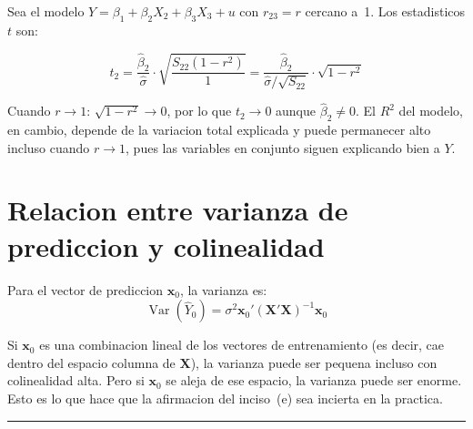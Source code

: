 \documentclass[12pt, letterpaper]{article}
\theoremstyle{remark}
\newcommand{\Var}{\operatorname{Var}}
\begin{document}
Sea el modelo $Y = \beta_1 + \beta_2 X_2 + \beta_3 X_3 + u$ con
$r_{23} = r$ cercano a~1. Los estadisticos $t$ son:

\begin{equation}
  t_2 = \frac{\hat\beta_2}{\hat\sigma} \cdot \sqrt{\frac{S_{22}(1-r^2)}{1}}
      = \frac{\hat\beta_2}{\hat\sigma/\sqrt{S_{22}}} \cdot \sqrt{1-r^2}
\end{equation}

Cuando $r \to 1$: $\sqrt{1-r^2} \to 0$, por lo que $t_2 \to 0$ aunque
$\hat\beta_2 \neq 0$. El $R^2$ del modelo, en cambio, depende de la variacion
total explicada y puede permanecer alto incluso cuando $r \to 1$, pues las
variables en conjunto siguen explicando bien a $Y$.

\section{Relacion entre varianza de prediccion y colinealidad}

Para el vector de prediccion $\mathbf{x}_0$, la varianza es:
\begin{equation}
  \Var(\hat Y_0) = \sigma^2 \mathbf{x}_0'(\mathbf{X'X})^{-1}\mathbf{x}_0
\end{equation}

Si $\mathbf{x}_0$ es una combinacion lineal de los vectores de entrenamiento
(es decir, cae dentro del espacio columna de $\mathbf{X}$), la varianza puede
ser pequena incluso con colinealidad alta. Pero si $\mathbf{x}_0$ se aleja
de ese espacio, la varianza puede ser enorme. Esto es lo que hace que la
afirmacion del inciso~(e) sea incierta en la practica.

\vspace{14pt}
\noindent\rule{\linewidth}{0.4pt}

\end{document}
